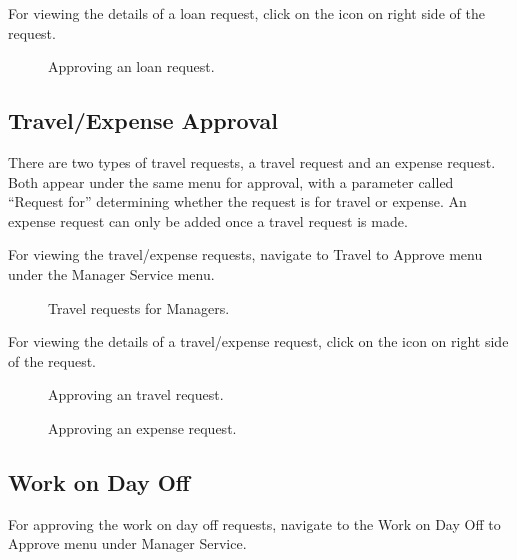 \documentclass[letterpaper,10pt,english]{sphinxmanual}
\begin{document}
For viewing the details of a loan request, click on the \sphinxstyleemphasis{} icon on right side of the request.

\begin{figure}[htbp]
\centering
\capstart

\noindent{}
\caption{Approving an loan request.}\label{\detokenize{manager/manager-approval:id12}}\end{figure}


\subsection{Travel/Expense Approval}
\label{\detokenize{manager/manager-approval:travel-expense-approval}}
There are two types of travel requests, a travel request and an expense request. Both appear under the same menu for approval, with a parameter called “Request for” determining whether the request is for travel or expense. An expense request can only be added once a travel request is made.

For viewing the travel/expense requests, navigate to Travel to Approve menu under the Manager Service menu.

\begin{figure}[htbp]
\centering
\capstart

\noindent{}
\caption{Travel requests for Managers.}\label{\detokenize{manager/manager-approval:id13}}\end{figure}

For viewing the details of a travel/expense request, click on the \sphinxstyleemphasis{} icon on right side of the request.

\begin{figure}[htbp]
\centering
\capstart

\noindent{}
\caption{Approving an travel request.}\label{\detokenize{manager/manager-approval:id14}}\end{figure}

\begin{figure}[htbp]
\centering
\capstart

\noindent{}
\caption{Approving an expense request.}\label{\detokenize{manager/manager-approval:id15}}\end{figure}


\subsection{Work on Day Off}
\label{\detokenize{manager/manager-approval:work-on-day-off}}\label{\detokenize{manager/manager-approval:id3}}
For approving the work on day off requests, navigate to the Work on Day Off to Approve menu under Manager Service.
\end{document}
